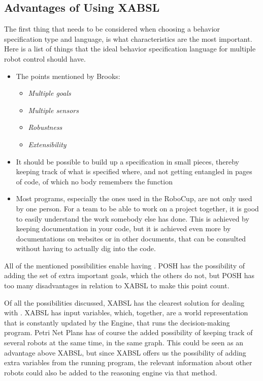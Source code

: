 \documentclass[a4paper,10pt]{article}
\begin{document}
\subsection{Advantages of Using XABSL}
The first thing that needs to be considered when choosing a behavior
specification type and language, is what characteristics are the most
important. Here is a list of things that the ideal behavior specification
language for multiple robot control should have.
\begin{itemize}
    \item The points mentioned by Brooks:
    \begin{itemize}
        \item \textit{Multiple goals}
        \item \textit{Multiple sensors}
        \item \textit{Robustness}
        \item \textit{Extensibility}
    \end{itemize}
    \item {} It should be possible to build up a specification
    in small pieces, thereby keeping track of what is specified where, and not
    getting entangled in pages of code, of which no body remembers the function
    \item {} Most programs, especially the ones used in the
    RoboCup, are not only used by one person. For a team to be able to work on a
    project together, it is good to easily understand the work somebody else has
    done. This is achieved by keeping documentation in your code, but it is
    achieved even more by documentations on websites or in other documents, that can be consulted
    without having to actually dig into the code.
\end{itemize}

All of the mentioned possibilities enable having . POSH has the possibility of adding the set of extra important goals,
which the others do not, but POSH has too many disadvantages in relation to
XABSL to make this point count.

Of all the possibilities discussed, XABSL has the
clearest solution for dealing with . XABSL has input variables,
which, together, are a world representation that is constantly updated by the
Engine, that runs the decision-making program. Petri Net Plans has of course the
added possibility of keeping track of several robots at the same time, in the
same graph. This could be seen as an advantage above XABSL, but since XABSL
offers us the possibility of adding extra variables from the running program,
the relevant information about other robots could also be added to the reasoning
engine via that method.
\end{document}
